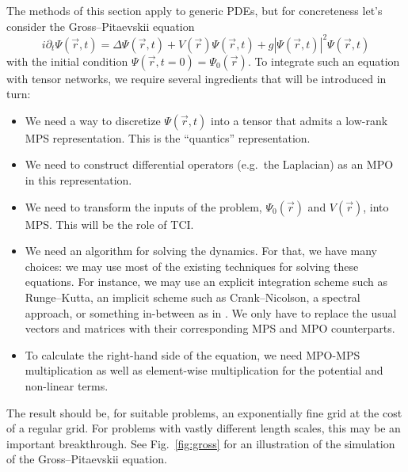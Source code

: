 \documentclass{SciPost}
\begin{document}
The methods of this section apply to generic PDEs, but for concreteness let’s consider the Gross--Pitaevskii equation
\begin{equation}
i \partial_t \Psi(\vec r,t) = \Delta\Psi (\vec r,t) + V(\vec r)\Psi(\vec r,t) + g |\Psi(\vec r,t)|^2
\Psi(\vec r,t)
\end{equation}
with the initial condition $\Psi(\vec r,t=0) = \Psi_0(\vec r)$. To integrate such an equation with tensor networks, we require several ingredients that will be introduced in turn:
\begin{itemize}
\item We need a way to discretize $\Psi(\vec r,t)$ into a tensor that admits a low-rank MPS representation. This is the ``quantics'' representation.
\item We need to construct differential operators (e.g.\ the Laplacian) as an MPO in this representation.
\item We need to transform the inputs of the problem, $\Psi_0(\vec r)$ and $V(\vec r)$, into MPS. This will be the role of TCI.
\item We need an algorithm for solving the dynamics. For that, we have many choices: we may use most of the existing techniques for solving these equations. For instance, we may use an explicit integration scheme such as Runge--Kutta, an implicit scheme such as Crank--Nicolson, a spectral approach, or something in-between as in \cite{niedermeier2025}. We only have to replace the usual vectors and matrices with their corresponding MPS and MPO counterparts.
\item To calculate the right-hand side of the equation, we need MPO-MPS multiplication as well as element-wise multiplication for the potential and non-linear terms.
\end{itemize}
The result should be, for suitable problems, an exponentially fine grid at the cost of a regular grid. For problems with vastly different length scales, this may be an important breakthrough. See Fig.~\ref{fig:gross} for an illustration of the simulation of the Gross--Pitaevskii equation.
\end{document}
